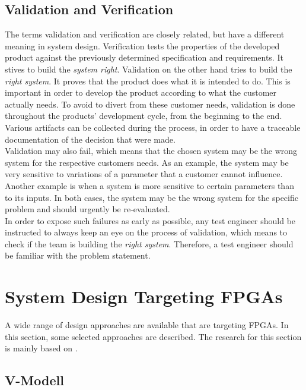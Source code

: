 \subsection{Validation and Verification}

The terms validation and verification are closely related, but have a different meaning in system design.
Verification tests the properties of the developed product against the previously determined specification and requirements.
It stives to build the \textit{system right}.
Validation on the other hand tries to build the \textit{right system}.
It proves that the product does what it is intended to do.
This is important in order to develop the product according to what the customer actually needs.
To avoid to divert from these customer needs, validation is done throughout the products' development cycle, from the beginning to the end.
Various artifacts can be collected during the process, in order to have a traceable documentation of the decision that were made.\\

Validation may also fail, which means that the chosen system may be the wrong system for the respective customers needs.
As an example, the system may be very sensitive to variations of a parameter that a customer cannot influence.
Another example is when a system is more sensitive to certain parameters than to its inputs.
In both cases, the system may be the wrong system for the specific problem and should urgently be re-evaluated.\\

In order to expose such failures as early as possible, any test engineer should be instructed to always keep an eye on the process of validation, which means to check if the team is building the \textit{right system}.
Therefore, a test engineer should be familiar with the problem statement.

\section{System Design Targeting FPGAs}

A wide range of design approaches are available that are targeting FPGAs.
In this section, some selected approaches are described.
The research for this section is mainly based on \cite{GesslerRalf2014EES}.

\subsection{V-Modell}

